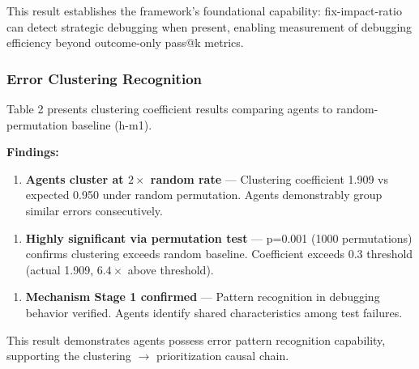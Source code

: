 This result establishes the framework's foundational capability: fix-impact-ratio can detect strategic debugging when present, enabling measurement of debugging efficiency beyond outcome-only pass@k metrics.

\subsubsection{Error Clustering Recognition}

Table 2 presents clustering coefficient results comparing agents to random-permutation baseline (h-m1).

\begin{table}[htbp]
\centering
{}
\end{table}

\textbf{Findings:}

\begin{enumerate}
\item \textbf{Agents cluster at $2\times$ random rate} --- Clustering coefficient 1.909 vs expected 0.950 under random permutation. Agents demonstrably group similar errors consecutively.
\end{enumerate}

\begin{enumerate}
\item \textbf{Highly significant via permutation test} --- p=0.001 (1000 permutations) confirms clustering exceeds random baseline. Coefficient exceeds 0.3 threshold (actual 1.909, 6.$4\times$ above threshold).
\end{enumerate}

\begin{enumerate}
\item \textbf{Mechanism Stage 1 confirmed} --- Pattern recognition in debugging behavior verified. Agents identify shared characteristics among test failures.
\end{enumerate}

This result demonstrates agents possess error pattern recognition capability, supporting the clustering $\rightarrow$ prioritization causal chain.


